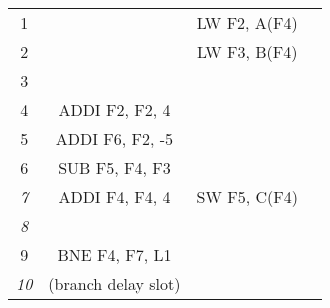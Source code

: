 \begin{enumerate}
\begin{table}[H]
\begin{tabular}{c|ccc}
            1                    &                      & LW F2, A(F4)         &              \\
            2                    &                      & LW F3, B(F4)         &              \\
            3                    &                      &                      &              \\
            4                    & ADDI F2, F2, 4       &                      &              \\
            5                    & ADDI F6, F2, -5      &                      &              \\
            6                    & SUB F5, F4, F3       &                      &              \\
            \textit{7}           & ADDI F4, F4, 4       & SW F5, C(F4)         &              \\
            \textit{8}           &                      &                      &              \\
            9                    & BNE F4, F7, L1       &                      &              \\
            \textit{10}          & (branch delay slot)  &                      &             
            \end{tabular}
        \end{table}
\end{enumerate}


